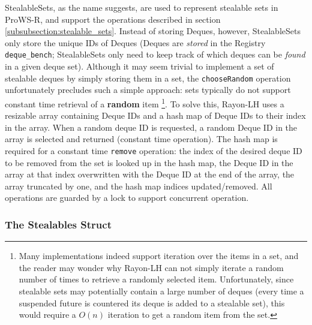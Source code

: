 \documentclass[bsc,frontabs,singlespacing,parskip,deptreport,normalheadings]{infthesis}
\begin{document}
StealableSets, as the name suggests, are used to represent stealable sets in
ProWS-R, and support the operations described in section
\ref{subsubsection:stealable_sets}. Instead of storing Deques, however,
StealableSets only store the unique IDs of Deques (Deques are \textit{stored} in
the Registry \texttt{deque\_bench}; StealableSets only need to keep track of
which deques can be \textit{found} in a given deque set). Although it may seem
trivial to implement a set of stealable deques by simply storing them in a set,
the \texttt{chooseRandom} operation unfortunately precludes such a simple
approach: sets typically do not support constant time retrieval of a
\textbf{random} item \footnote{Many implementations indeed support iteration
    over the items in a set, and the reader may wonder why Rayon-LH can not
    simply iterate a random number of times to retrieve a randomly selected
    item. Unfortunately, since stealable sets may potentially contain a large
    number of deques (every time a suspended future is countered its deque is
    added to a stealable set), this would require a \(O(n)\) iteration to get a
random item from the set.}. To solve this, Rayon-LH uses a resizable array
containing Deque IDs and a hash map of Deque IDs to their index in the
array. When a random deque ID is requested, a random Deque ID in the array
is selected and returned (constant time operation). The hash map is required for
a constant time \texttt{remove} operation: the index of the desired deque ID to
be removed from the set is looked up in the hash map, the Deque ID in the array
at that index overwritten with the Deque ID at the end of the array, the array
truncated by one, and the hash map indices updated/removed. All operations are
guarded by a lock to support concurrent operation.

\subsubsection*{The Stealables Struct}
\label{subsubsection:the_stealables_struct}
\end{document}

